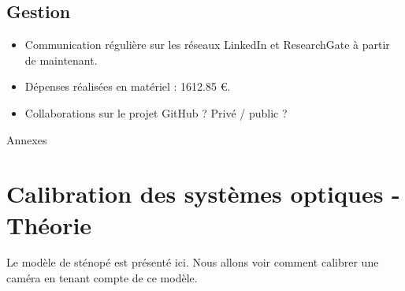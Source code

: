 \documentclass[a4paper, 11pt]{article}
\begin{document}
	\subsection*{Gestion}
		\begin{itemize}[label=$\rightarrow$]
			\item Communication régulière sur les réseaux LinkedIn et ResearchGate à partir de maintenant.
			\item Dépenses réalisées en matériel : \num{1612.85} \euro.
			\item Collaborations sur le projet GitHub ? Privé / public ?
		\end{itemize}
		





\appendix
\newpage
\null
\begin{center}
	\vfill\Huge
	Annexes
	\vfill\null
\end{center}
\newpage

\section{Calibration des systèmes optiques - Théorie}
	\label{annexe:calibration}
	Le modèle de sténopé est présenté ici. Nous allons voir comment calibrer une caméra en tenant compte de ce modèle.
\end{document}
